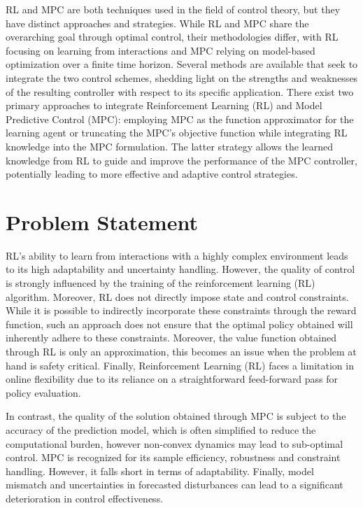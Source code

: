 RL and MPC are both techniques used in the field of control theory, but they have distinct approaches and strategies. While RL and MPC share the overarching goal through optimal control, their methodologies differ, with RL focusing on learning from interactions and MPC relying on model-based optimization over a finite time horizon. 
Several methods are available that seek to integrate the two control schemes, shedding light on the strengths and weaknesses of the resulting controller with respect to its specific application. There exist two primary approaches to integrate Reinforcement Learning (RL) and Model Predictive Control (MPC): employing MPC as the function approximator for the learning agent or truncating the MPC's objective function while integrating RL knowledge into the MPC formulation. The latter strategy allows the learned knowledge from RL to guide and improve the performance of the MPC controller, potentially leading to more effective and adaptive control strategies.

\section{Problem Statement}

RL's ability to learn from interactions with a highly complex environment leads to its high adaptability and uncertainty handling. However, the quality of control is strongly influenced by the training of the reinforcement learning (RL) algorithm. Moreover, RL does not directly impose state and control constraints. While it is possible to indirectly incorporate these constraints through the reward function, such an approach does not ensure that the optimal policy obtained will inherently adhere to these constraints. Moreover, the value function obtained through RL is only an approximation, this becomes an issue when the problem at hand is safety critical. Finally, Reinforcement Learning (RL) faces a limitation in online flexibility due to its reliance on a straightforward feed-forward pass for policy evaluation.

In contrast, the quality of the solution obtained through MPC is subject to the accuracy of the prediction model, which is often simplified to reduce the computational burden, however non-convex dynamics may lead to sub-optimal control. MPC is recognized for its sample efficiency, robustness and constraint handling. However, it falls short in terms of adaptability. Finally, model mismatch and uncertainties in forecasted disturbances can lead to a significant deterioration in control effectiveness. 

